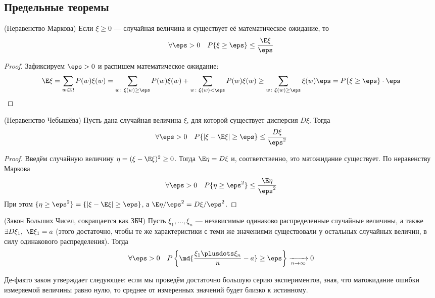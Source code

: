 \subsection{Предельные теоремы}

\begin{theorem} (Неравенство Маркова)
	Если $\xi \ge 0$ --- случайная величина и существует её математическое ожидание, то
	\[
		\forall \eps > 0 \quad P\{\xi \ge \eps\} \le \frac{\E\xi}{\eps}
	\]
\end{theorem}

\begin{proof}
	Зафиксируем $\eps > 0$ и распишем математическое ожидание:
	\[
		\E\xi = \sum_{w \in \Omega} P(w)\xi(w) = \sum_{w \colon \xi(w) \ge \eps} P(w)\xi(w) + \sum_{w \colon \xi(w) < \eps} P(w)\xi(w) \ge \sum_{w \colon \xi(w) \ge \eps} \xi(w)\eps = P\{\xi \ge \eps\} \cdot \eps
	\]
\end{proof}

\begin{corollary} (Неравенство Чебышёва)
	Пусть дана случайная величина $\xi$, для которой существует дисперсия $D\xi$. Тогда
	\[
		\forall \eps > 0 \quad P\{|\xi - \E\xi| \ge \eps\} \le \frac{D\xi}{\eps^2}
	\]
\end{corollary}

\begin{proof}
	Введём случайную величину $\eta = (\xi - \E\xi)^2 \ge 0$. Тогда $\E\eta = D\xi$ и, соответственно, это матожидание существует. По неравенству Маркова
	\[
		\forall \eps > 0 \quad P\{\eta \ge \eps^2\} \le \frac{\E\eta}{\eps^2}
	\]
	При этом $\{\eta \ge \eps^2\} = \{|\xi - \E\xi| \ge \eps\}$, а $\E\eta / \eps^2 = D\xi / \eps^2$.
\end{proof}

\begin{theorem} (Закон Больших Чисел, сокращается как ЗБЧ)
	Пусть $\xi_1, \ldots, \xi_n$ --- независимые одинаково распределенные случайные величины, а также $\exists D\xi_1,\ \E\xi_1 = a$ (этого достаточно, чтобы те же характеристики с теми же значениями существовали у остальных случайных величин, в силу одинакового распределения). Тогда
	\[
		\forall \eps > 0 \quad P\left\{\md{\frac{\xi_1 \plusdots \xi_n}{n} - a} \ge \eps\right\} \xrightarrow[n \to \infty]{} 0
	\]
\end{theorem}

\begin{note}
	Де-факто закон утверждает следующее: если мы проведём достаточно большую серию экспериментов, зная, что матожидание ошибки измеряемой величины равно нулю, то среднее от измеренных значений будет близко к истинному.
\end{note}

